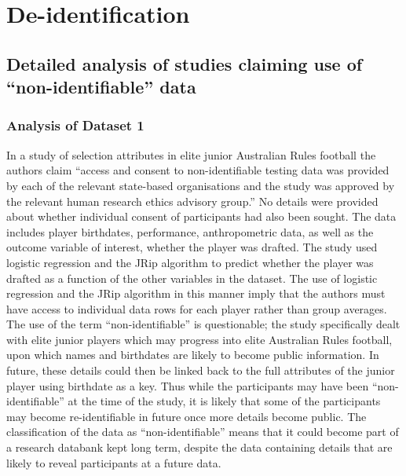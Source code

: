 
\openchapterblock
\chapter{De-identification}
\label{appendix:deidentification}

\section{Detailed analysis of studies claiming use of ``non-identifiable'' data}

\subsection{Analysis of Dataset 1}


In a study of selection attributes in elite junior Australian Rules football \cite{Robertson2015} the authors claim ``access and consent to non-identifiable testing data was provided by each of the relevant state-based organisations and the study was approved by the relevant human research ethics advisory group.'' No details were provided about whether individual consent of participants had also been sought. The data includes player birthdates, performance, anthropometric data, as well as the outcome variable of interest, whether the player was drafted. The study used logistic regression and the JRip algorithm to predict whether the player was drafted as a function of the other variables in the dataset. The use of logistic regression and the JRip algorithm in this manner imply that the authors must have access to individual data rows for each player rather than group averages. The use of the term ``non-identifiable'' is questionable; the study specifically dealt with elite junior players which may progress into elite Australian Rules football, upon which names and birthdates are likely to become public information. In future, these details could then be linked back to the full attributes of the junior player using birthdate as a key. Thus while the participants may have been ``non-identifiable'' at the time of the study, it is likely that some of the participants may become re-identifiable in future once more details become public. The classification of the data as ``non-identifiable'' means that it could become part of a research databank kept long term, despite the data containing details that are likely to reveal participants at a future data.

